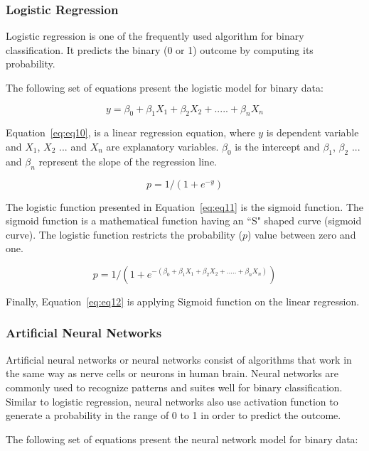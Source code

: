 \documentclass[runningheads]{llncs}
\begin{document}
\subsubsection {Logistic Regression}
\label{sec:LR}
Logistic regression is one of the frequently used algorithm for binary classification. It predicts the binary (0 or 1) outcome by computing its probability.

The following set of equations present the logistic model for binary data:

\begin{equation}
\label{eq:eq10}
y = \beta_0 + \beta_1 X_1 + \beta_2 X_2 + ..... + \beta_n X_n
\end{equation}

Equation~\ref{eq:eq10}, is a linear regression equation, where $y$ is dependent variable and $X_1$, $X_2$ $...$ and $X_n$ are explanatory variables. $\beta_0$ is the intercept and  $\beta_1$, $\beta_2$  ... and  $\beta_n$ represent the slope of the regression line.

\begin{equation}
\label{eq:eq11}
p = 1/(1 + e^{-y})
\end{equation}

The logistic function presented in Equation~\ref{eq:eq11} is the sigmoid function. The sigmoid function is a mathematical function having an ``S" shaped curve (sigmoid curve). The logistic function restricts the probability ($p$) value between zero and one.

\begin{equation}
\label{eq:eq12}
p = 1/(1 + e^{-(\beta_0 + \beta_1 X_1 + \beta_2 X_2 + ..... + \beta_n X_n)})
\end{equation}

Finally, Equation~\ref{eq:eq12} is applying Sigmoid function on the linear regression.

\subsubsection {Artificial Neural Networks}
\label{sec:NW}
Artificial neural networks or neural networks consist of algorithms that work in the same way as nerve cells or neurons in human brain. Neural networks are commonly used to recognize patterns and suites well for binary classification. Similar to logistic regression, neural networks also use activation function to generate a probability in the range of 0 to 1 in order to predict the outcome. 

The following set of equations present the neural network model for binary data:
\end{document}
